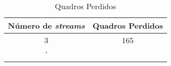 
\begin{table}[H]
    \centering
    \caption{Quadros Perdidos}
    \label{tab:results:dropped_frames_table}
    \begin{tabular}{|c|c|}
    \toprule
    Número de \textit{streams} & Quadros Perdidos \\
    \midrule
    3 & 165 \\'
    \bottomrule
    \end{tabular}
\end{table}